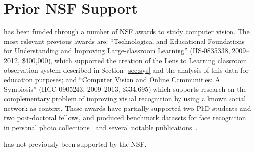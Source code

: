 \section{Prior NSF Support}

 has been funded through a number of NSF awards to study computer vision. The most relevant previous awards are: ``Technological and Educational Foundations for Understanding and Improving Large-classroom Learning'' (IIS-0835338, 2009--2012, \$400,000), which supported the creation of the Lens to Learning classroom observation system described in Section~\ref{sec:sys} and the analysis of this data for education purposes; and ``Computer Vision and Online Communities: A Symbiosis'' (HCC-0905243, 2009--2013, \$334,695) which supports research on the complementary problem of improving visual recognition by using a known social network as context. These awards have partially supported two PhD students and two post-doctoral fellows, and produced benchmark datasets for face recognition in personal photo collections~\cite{PintoZicker2011} and several notable publications~\cite{Stone2010,owens2011learning,LiZickler2012,xiong2012pixels}.

 has not previously been supported by the NSF.
